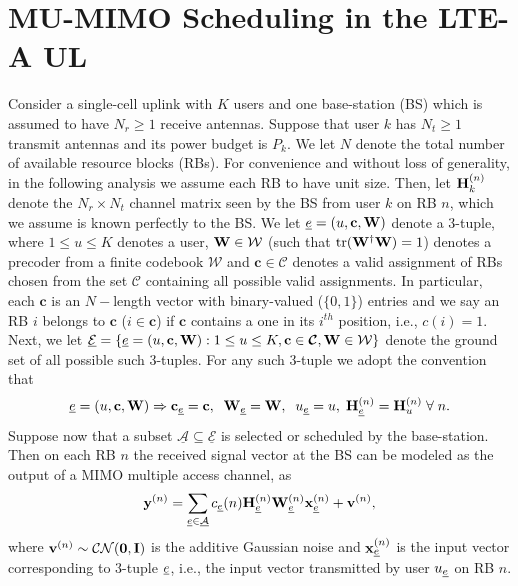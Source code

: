 \documentclass[11pt] {article}
\newcommand{\Zrb}     {{\uwti 0}}      \newcommand{\Oneb}    {{\uwti 1}}
\newcommand{\uwti}[1]{{\mathbf #1}}
\newcommand{\cb}{{\uwti c}}  \newcommand{\Cb}{{\uwti C}}
\newcommand{\vb}{{\uwti v}}  \newcommand{\Vb}{{\uwti V}}
\newcommand{\xb}{{\uwti x}}  \newcommand{\Xb}{{\uwti X}}
\newcommand{\yb}{{\uwti y}}  \newcommand{\Yb}{{\uwti Y}}
\newcommand{\Cc} {{\mathcal C}}         \newcommand{\Ck} {{\bm {\mathcal C}}}
\newcommand{\Nc} {{\mathcal N}}         \newcommand{\Nk} {{\bm {\mathcal N}}}
\newcommand{\Wc} {{\mathcal W}}         \newcommand{\Wk} {{\bm {\mathcal W}}}
\newcommand{\Aulc} {{\underline{\mathcal A}}}
\newcommand{\Eulc} {{\underline{\mathcal E}}}
\begin{document}
\section{MU-MIMO Scheduling in the  LTE-A UL}\label{sec:musetup}
Consider a single-cell uplink with $K$ users and one base-station (BS) which is assumed to have $N_r\geq 1$ receive antennas. Suppose that user $k$ has $N_t\geq 1$ transmit antennas and its power budget is $P_k$. We let  $N$ denote the total number of available resource blocks (RBs). For convenience and without loss of generality, in the following analysis we assume each RB to have unit size.  Then, let $\Hb_{k}^{(n)}$ denote the $N_r\times N_t$ channel matrix seen by the BS from user $k$ on RB $n$, which we assume is known perfectly to the BS. We let $\eul=(u,\cb,\Wb)$ denote a 3-tuple, where $1\leq u\leq K$ denotes a user, $\Wb\in\Wc$ (such that $\tr(\Wb^{\dag}\Wb)=1$) denotes a precoder from a finite codebook $\Wc$ and $\cb\in\Ck$ denotes a valid assignment of RBs chosen from the set $\Ck$ containing all possible valid assignments. In particular, each $\cb$ is an $N-$length vector with binary-valued ($\{0,1\}$) entries and we say an RB $i$ belongs to $\cb$ ($i\in\cb$) if $\cb$ contains a one in its $i^{th}$ position, i.e., $c(i)=1$. Next, we let  $\Eulc=\{\eul=(u,\cb,\Wb):1\leq u\leq K,\cb\in\Ck,\Wb\in\Wc\}$ denote the ground set of all possible such 3-tuples. For any such 3-tuple we adopt the convention that
\begin{eqnarray}
\nonumber \eul=(u,\cb,\Wb)\Rightarrow \cb_{\eul}=\cb,\;\;\Wb_{\eul}=\Wb,\;\;u_{\eul}=u,\;\Hb_{\eul}^{(n)}=\Hb^{(n)}_u\;\forall\;n.
\end{eqnarray}
Suppose now that a subset $\Aulc\subseteq\Eulc$ is selected or scheduled by the base-station. Then on each RB $n$  the received signal vector at the BS can be modeled as the output of a MIMO multiple access channel, as
\begin{equation}\label{eq:propfinmodOr}
\yb^{(n)}=\sum_{\eul\in\Aulc}c_{\eul}(n)\Hb^{(n)}_{\eul}\Wb^{(n)}_{\eul}\xb^{(n)}_{\eul} + \vb^{(n)},
\end{equation}
where
 $\vb^{(n)}\sim\Cc\Nc(\Zrb,\Ib)$ is the additive Gaussian noise and $\xb^{(n)}_{\eul}$ is the input vector corresponding to 3-tuple ${\underline e}$, i.e., the input vector transmitted by user $u_{{\underline e}}$ on RB $n$.
\end{document}
